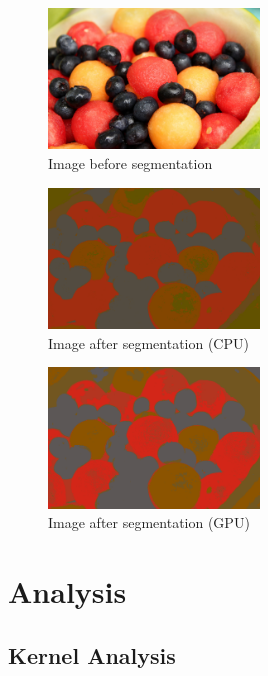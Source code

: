 \documentclass[11pt]{article}
\begin{document}
\begin{figure}[ht]
    \centering
    \includegraphics[width=0.5\textwidth]{fruit.png}
    \caption{Image\cite{fruit} before segmentation}
    \label{fig:fruit}
\end{figure}

\begin{figure}[ht]
    \centering
    \includegraphics[width=0.5\textwidth]{fruit-segmented-cpu.png}
    \caption{Image after segmentation (CPU)}
    \label{fig:fruit-segmented-cpu}
\end{figure}

\begin{figure}[ht]
    \centering
    \includegraphics[width=0.5\textwidth]{fruit-segmented-gpu.png}
    \caption{Image after segmentation (GPU)}
    \label{fig:fruit-segmented-gpu}
\end{figure}


\section{Analysis}

\subsection{Kernel Analysis}
\end{document}

